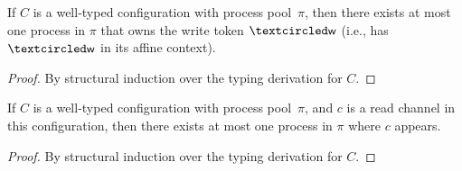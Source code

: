
\begin{lemma}
\label{lem:UniqueWriter}
If $C$ is a well-typed configuration with process pool~$\pi$, then there exists at
most one process in $\pi$ that owns the write token $\wrtok$ (i.e., has $\wrtok$
in its affine context).
\begin{proof}
By structural induction over the typing derivation for $C$.
\end{proof}
\end{lemma}

\begin{lemma}
\label{lem:UniqueReader}
If $C$ is a well-typed configuration with process pool~$\pi$, 
and $c$ is a read channel in this configuration,
then there exists at most one process in $\pi$ where $c$ appears.
\begin{proof}
By structural induction over the typing derivation for $C$.
\end{proof}
\end{lemma}

